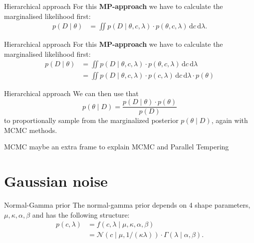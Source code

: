 \documentclass{beamer}
\newcommand{\dx}{\, \mathrm{d}}
\begin{document}
	\begin{frame}{Hierarchical approach}
		For this \textbf{MP-approach} we have to calculate the marginalised 
		likelihood first:
		\begin{align*}
			p(D \mid \theta) &= \iint p(D \mid \theta, c, \lambda) \cdot 
			p(\theta, c, \lambda) \dx c \dx \lambda.
		\end{align*}
	\end{frame}
	
	\begin{frame}{Hierarchical approach}
		For this \textbf{MP-approach} we have to calculate the marginalised 
		likelihood first:
		\begin{align*}
			p(D \mid \theta) &= \iint p(D \mid \theta, c, \lambda) \cdot 
			p(\theta, c, \lambda) \dx c \dx \lambda \\
			&= \iint p(D \mid \theta, c, \lambda) \cdot 
			p(c, \lambda) \dx c \dx \lambda \cdot p(\theta)
		\end{align*}
	\end{frame}
	
	\begin{frame}{Hierarchical approach}
		We can then use that
		\[
			p(\theta \mid D) = \frac{p(D \mid \theta) \cdot
			p(\theta)}{p(D)}
		\]
		to proportionally sample from the marginalized posterior 
		$p(\theta \mid D)$, again with MCMC methods.
	\end{frame}
	
	\begin{frame}{MCMC}
		maybe an extra frame to explain MCMC and Parallel Tempering
	\end{frame}
	
	
	
\section{Gaussian noise}
  	
  	\begin{frame}{Normal-Gamma prior}
  		The normal-gamma prior depends on 4 shape parameters, $\mu, \kappa, 				\alpha, \beta$ and has the following structure:
  		\begin{align*}
  			p(c, \lambda) &= f(c, \lambda \mid \mu, \kappa, \alpha, \beta) \\
  			&= \mathcal{N}(c \mid \mu, 1/(\kappa \lambda)) \cdot \Gamma(\lambda 				\mid \alpha, \beta).
  		\end{align*}
  	\end{frame}
  	
\end{document}
